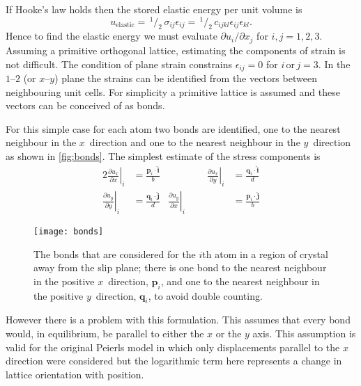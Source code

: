 If Hooke's law holds then the stored elastic energy per unit volume is
\begin{equation}
u_{\text{elastic}} =\, ^{1}\!/_{2}\, \sigma_{ij} \epsilon_{ij} =\, ^{1}\!/_{2}\, c_{ijkl} \epsilon_{ij} \epsilon_{kl}.
\end{equation}
Hence to find the elastic energy we must evaluate \({\partial u_i}/{\partial x_j}\) for $i, j = 1, 2, 3$.
Assuming a primitive orthogonal lattice, estimating the components of strain is not difficult. The  condition of plane strain constrains $\epsilon_{ij} = 0$ for $i\, \text{or}\, j=3$. In the $1$--$2$ (or $x$--$y$) plane the strains can be identified from the vectors between neighbouring unit cells. For simplicity a primitive lattice is assumed and these vectors can be conceived of as bonds.

For this simple case for each atom two bonds are identified, one to the nearest neighbour in the $x$~direction and one to the nearest neighbour in the $y$~direction as shown in \autoref{fig:bonds}. The simplest estimate of the stress components is
\begin{alignat}{2}\label{eqn:estimate_strains}
\left. \frac{\partial u_x}{\partial x}\right|_i &= \frac{\mathbf{p}_i \cdot \mathbf{\hat{i}}}{b} &\qquad\qquad
\left. \frac{\partial u_x}{\partial y}\right|_i &= \frac{\mathbf{q}_i \cdot \mathbf{\hat{i}}}{d} \nonumber\\
\left. \frac{\partial u_y}{\partial y}\right|_i &= \frac{\mathbf{q}_i \cdot \mathbf{\hat{j}}}{d} &
\left. \frac{\partial u_y}{\partial x}\right|_i &= \frac{\mathbf{p}_i \cdot \mathbf{\hat{j}}}{b}
\end{alignat}


\begin{figure}
\centering
\texttt{[image: bonds]}
\caption[Strained bonds in a dislocated crystal.]{The bonds that are considered for the $i$th atom in a region of crystal away from the slip plane; there is one bond to the nearest neighbour in the positive $x$~direction, $\mathbf{p}_i$, and one to the nearest neighbour in the positive $y$~direction, $\mathbf{q}_i$, to avoid double counting.\label{fig:bonds} }
\end{figure}





However there is a problem with this formulation. This assumes that every bond would, in equilibrium, be parallel to either the $x$ or the $y$ axis. This assumption is valid for the original Peierls model in which only displacements parallel to the $x$ direction were considered but the logarithmic term here represents a change in lattice orientation with position. 

